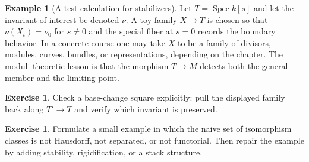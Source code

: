 \documentclass[11pt]{amsart}
\theoremstyle{definition}
\newtheorem{example}[theorem]{Example}
\newtheorem{exercise}[theorem]{Exercise}
\newcommand{\Spec}{\operatorname{Spec}}
\begin{document}
\begin{example}[A test calculation for stabilizers]
Let $T=\Spec k[s]$ and let the invariant of interest be denoted $\nu$.  A toy family $X\to T$ is chosen so that $\nu(X_t)=\nu_0$ for $s\ne0$ and the special fiber at $s=0$ records the boundary behavior.  In a concrete course one may take $X$ to be a family of divisors, modules, curves, bundles, or representations, depending on the chapter.  The moduli-theoretic lesson is that the morphism $T\to M$ detects both the general member and the limiting point.
\end{example}
\begin{exercise}
Check a base-change square explicitly: pull the displayed family back along $T\prime\to T$ and verify which invariant is preserved.
\end{exercise}
\begin{exercise}
Formulate a small example in which the naive set of isomorphism classes is not Hausdorff, not separated, or not functorial.  Then repair the example by adding stability, rigidification, or a stack structure.
\end{exercise}
\clearpage
\end{document}
